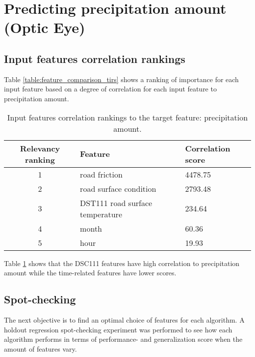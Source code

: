 \section{Predicting precipitation amount (Optic Eye)}
	\subsection{Input features correlation rankings}
	Table \ref{table:feature_comparison_tirs} shows a ranking of importance for each input feature based on a degree of correlation for each input feature to precipitation amount.

	\begin{table}[H]
		\centering
		\caption{Input features correlation rankings to the target feature: precipitation amount. }
		\begin{tabular}[3]{c | l | l }
    			Relevancy ranking & Feature & Correlation score  \\
			 \hline
			1 & road friction & 4478.75 \\
			2 & road surface condition & 2793.48 \\
			3 & DST111 road surface temperature & 234.64 \\
			4 & month & 60.36 \\
			5 & hour & 19.93 
			\label{table:feature_comparison_precamount}
		\end{tabular}
	\end{table}

		Table \ref{table:feature_comparison_precamount} shows that the DSC111 features have high correlation to precipitation amount while the time-related features have lower scores. 

	\subsection{Spot-checking}
		The next objective is to find an optimal choice of features for each algorithm. A holdout regression spot-checking experiment was performed to see how each algorithm performs in terms of performance- and generalization score when the amount of features vary. 

